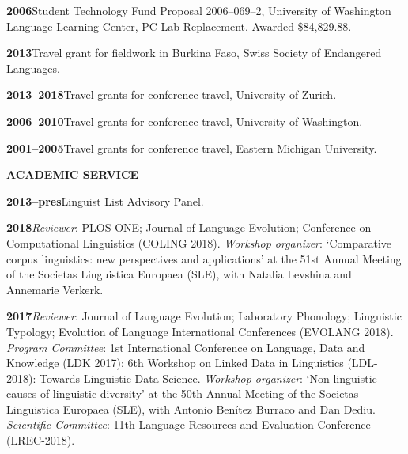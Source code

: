 \documentclass[11pt]{article}
\newcommand{\hangpara}{
 \setlength{\parindent}{0in} %
 \hangindent=0.42in %
}
\begin{document}
\vskip 6pt
\hangpara
{\bf 2006}\hspace{1ex}Student Technology Fund Proposal 2006--069--2, University of Washington Language Learning Center, PC Lab Replacement. Awarded \$84,829.88.

\vskip 6pt
\hangpara
{\bf 2013}\hspace{1ex}Travel grant for fieldwork in Burkina Faso, Swiss Society of Endangered Languages.

\vskip 6pt
\hangpara
{\bf 2013--2018}\hspace{1ex}Travel grants for conference travel, University of Zurich.

\vskip 6pt
\hangpara
{\bf 2006--2010}\hspace{1ex}Travel grants for conference travel, University of Washington.

\vskip 6pt
\hangpara
{\bf 2001--2005}\hspace{1ex}Travel grants for conference travel, Eastern Michigan University.



\vskip 20pt
\begin{flushleft}
{\bf ACADEMIC SERVICE}
\end{flushleft}


\hangpara
{\bf 2013--pres}\hspace{1ex}Linguist List Advisory Panel.

\vskip 6pt
\hangpara
{\bf 2018}\hspace{1ex}\textit{Reviewer}: PLOS ONE; Journal of Language Evolution; Conference on Computational Linguistics (COLING 2018). \textit{Workshop organizer}: `Comparative corpus linguistics: new perspectives and applications' at the 51st Annual Meeting of the Societas Linguistica Europaea (SLE), with Natalia Levshina and Annemarie Verkerk.

\vskip 6pt
\hangpara
{\bf 2017}\hspace{1ex}\textit{Reviewer}: Journal of Language Evolution; Laboratory Phonology; Linguistic Typology; Evolution of Language International Conferences (EVOLANG 2018). \textit{Program Committee}: 1st International Conference on Language, Data and Knowledge (LDK 2017); 6th Workshop on Linked Data in Linguistics (LDL-2018): Towards Linguistic Data Science. \textit{Workshop organizer}: `Non-linguistic causes of linguistic diversity' at the 50th Annual Meeting of the Societas Linguistica Europaea (SLE), with Antonio Ben{\'i}tez Burraco and Dan Dediu. \textit{Scientific Committee}: 11th Language Resources and Evaluation Conference (LREC-2018).
\end{document}
